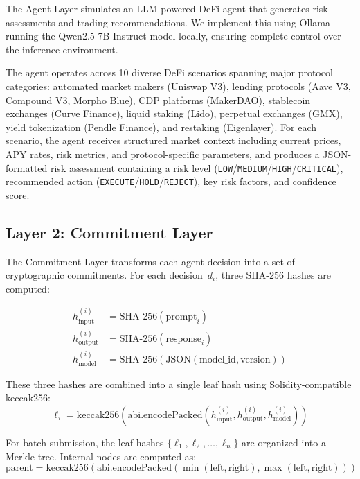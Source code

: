 \documentclass[manuscript,nonacm]{acmart}
\begin{document}
The Agent Layer simulates an LLM-powered DeFi agent that generates risk assessments and trading recommendations.
We implement this using Ollama~\cite{ollama} running the Qwen2.5-7B-Instruct model locally, ensuring complete control over the inference environment.

The agent operates across 10 diverse DeFi scenarios spanning major protocol categories: automated market makers (Uniswap V3), lending protocols (Aave V3, Compound V3, Morpho Blue), CDP platforms (MakerDAO), stablecoin exchanges (Curve Finance), liquid staking (Lido), perpetual exchanges (GMX), yield tokenization (Pendle Finance), and restaking (Eigenlayer).
For each scenario, the agent receives structured market context including current prices, APY rates, risk metrics, and protocol-specific parameters, and produces a JSON-formatted risk assessment containing a risk level (\texttt{LOW}/\texttt{MEDIUM}/\texttt{HIGH}/\texttt{CRITICAL}), recommended action (\texttt{EXECUTE}/\texttt{HOLD}/\texttt{REJECT}), key risk factors, and confidence score.

\subsection{Layer 2: Commitment Layer}

The Commitment Layer transforms each agent decision into a set of cryptographic commitments.
For each decision~$d_i$, three SHA-256 hashes are computed:

\begin{align}
h_{\text{input}}^{(i)} &= \text{SHA-256}(\text{prompt}_i) \\
h_{\text{output}}^{(i)} &= \text{SHA-256}(\text{response}_i) \\
h_{\text{model}}^{(i)} &= \text{SHA-256}(\text{JSON}(\text{model\_id}, \text{version}))
\end{align}

These three hashes are combined into a single leaf hash using Solidity-compatible keccak256:
\begin{equation}
\ell_i = \text{keccak256}(\text{abi.encodePacked}(h_{\text{input}}^{(i)}, h_{\text{output}}^{(i)}, h_{\text{model}}^{(i)}))
\end{equation}

For batch submission, the leaf hashes $\{\ell_1, \ell_2, \ldots, \ell_n\}$ are organized into a Merkle tree.
Internal nodes are computed as:
\begin{equation}
\text{parent} = \text{keccak256}(\text{abi.encodePacked}(\min(\text{left}, \text{right}), \max(\text{left}, \text{right})))
\end{equation}
\end{document}
